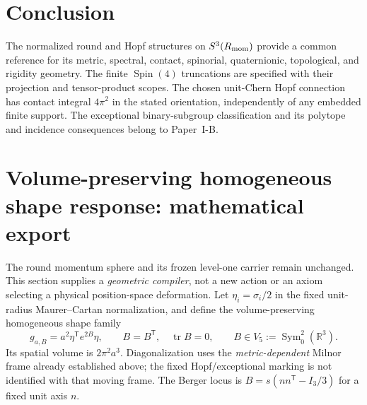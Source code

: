 \documentclass[11pt]{article}
\begin{document}
\clearpage
\section*{Conclusion}
The normalized round and Hopf structures on $S^3(R_{\mathrm{mom}})$ provide a common
reference for its metric, spectral, contact, spinorial, quaternionic,
topological, and rigidity geometry.  The finite $\operatorname{Spin}(4)$
truncations are specified with their projection and tensor-product scopes.
The chosen unit-Chern Hopf connection has contact integral $4\pi^2$ in
the stated orientation, independently of any embedded finite support.
The exceptional binary-subgroup classification and its polytope and
incidence consequences belong to Paper~I-B.


\section{Volume-preserving homogeneous shape response: mathematical export}
\label{bh:berger:v117:p1a:shape}
The round momentum sphere and its frozen level-one carrier remain unchanged.
This section supplies a \emph{geometric compiler}, not a new action or an
axiom selecting a physical position-space deformation.  Let
$\eta_i=\sigma_i/2$ in the fixed unit-radius Maurer--Cartan normalization,
and define the volume-preserving homogeneous shape family
\[
 g_{a,B}=a^2\eta^{\mathsf T}e^{2B}\eta,
 \qquad B=B^{\mathsf T},\quad \operatorname{tr}B=0,
 \qquad B\in V_5:=\operatorname{Sym}^2_0(\mathbb R^3).
\]
Its spatial volume is $2\pi^2a^3$.  Diagonalization uses the
\emph{metric-dependent} Milnor frame already established above; the
fixed Hopf/exceptional marking is not identified with that moving frame.
The Berger locus is $B=s(nn^{\mathsf T}-I_3/3)$ for a fixed unit axis $n$.
\end{document}
